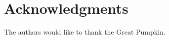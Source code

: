\documentclass{acm_proc_article-sp}
\begin{document}











\section{Acknowledgments}
The authors would like to thank the Great Pumpkin.



\end{document}
